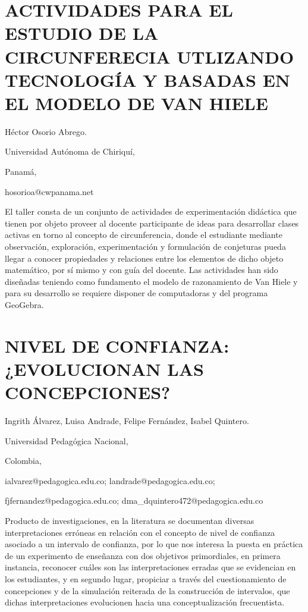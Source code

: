 \section{ACTIVIDADES PARA EL ESTUDIO DE LA CIRCUNFERECIA UTLIZANDO TECNOLOGÍA
Y BASADAS EN EL MODELO DE VAN HIELE}

\begin{datos}

Héctor Osorio Abrego. 

Universidad Autónoma de Chiriquí,

Panamá,

hosorioa@cwpanama.net

\end{datos}

El taller consta de un conjunto de actividades de experimentación
didáctica que tienen por objeto proveer al docente participante de
ideas para desarrollar clases activas en torno al concepto de circunferencia,
donde el estudiante mediante observación, exploración, experimentación
y formulación de conjeturas pueda llegar a conocer propiedades y relaciones
entre los elementos de dicho objeto matemático, por sí mismo y con
guía del docente. Las actividades han sido diseñadas teniendo como
fundamento el modelo de razonamiento de Van Hiele y para su desarrollo
se requiere disponer de computadoras y del programa GeoGebra.


\section{NIVEL DE CONFIANZA: ¿EVOLUCIONAN LAS CONCEPCIONES? }

\begin{datos}

Ingrith Álvarez, Luisa Andrade, Felipe Fernández, Isabel Quintero.

Universidad Pedagógica Nacional,

Colombia,

ialvarez@pedagogica.edu.co; landrade@pedagogica.edu.co;

fjfernandez@pedagogica.edu.co; dma\_dquintero472@pedagogica.edu.co

\end{datos}

Producto de investigaciones, en la literatura se documentan diversas
interpretaciones erróneas en relación con el concepto de nivel de
confianza asociado a un intervalo de confianza, por lo que nos interesa
la puesta en práctica de un experimento de enseñanza con dos objetivos
primordiales, en primera instancia, reconocer cuáles son las interpretaciones
erradas que se evidencian en los estudiantes, y en segundo lugar,
propiciar a través del cuestionamiento de concepciones y de la simulación
reiterada de la construcción de intervalos, que dichas interpretaciones
evolucionen hacia una conceptualización frecuentista.


